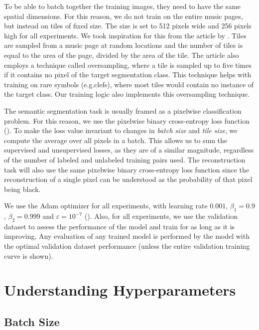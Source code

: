 To be able to batch together the training images, they need to have the same spatial dimensions. For this reason, we do not train on the entire music pages, but instead on tiles of fixed size. The size is set to 512 pixels wide and 256 pixels high for all experiments. We took inspiration for this from the article by \cite{HajicEtAl}. Tiles are sampled from a music page at random locations and the number of tiles is equal to the area of the page, divided by the area of the tile. The article also employs a technique called oversampling, where a tile is sampled up to five times if it contains no pixel of the target segmentation class. This technique helps with training on rare symbols (e.g.\@ clefs), where most tiles would contain no instance of the target class. Our training logic also implements this oversampling technique.

The semantic segmentation task is usually framed as a pixelwise classification problem. For this reason, we use the pixelwise binary cross-entropy loss function (\cite{DeepLearningBook}). To make the loss value invariant to changes in \emph{batch size} and \emph{tile size}, we compute the average over all pixels in a batch. This allows us to sum the supervised and unsupervised losses, as they are of a similar magnitude, regardless of the number of labeled and unlabeled training pairs used. The reconstruction task will also use the same pixelwise binary cross-entropy loss function since the reconstruction of a single pixel can be understood as the probability of that pixel being black.

We use the Adam optimizer for all experiments, with learning rate $0.001$, $\beta_1 = 0.9$, $\beta_2 = 0.999$ and $\varepsilon = 10^{-7}$ (\cite{AdamOptimizer}). Also, for all experiments, we use the validation dataset to assess the performance of the model and train for as long as it is improving. Any evaluation of any trained model is performed by the model with the optimal validation dataset performance (unless the entire validation training curve is shown).


\section{Understanding Hyperparameters}
\label{sec:UnderstandingHyperparameters}


\subsection{Batch Size}
\label{sec:BatchSize}

